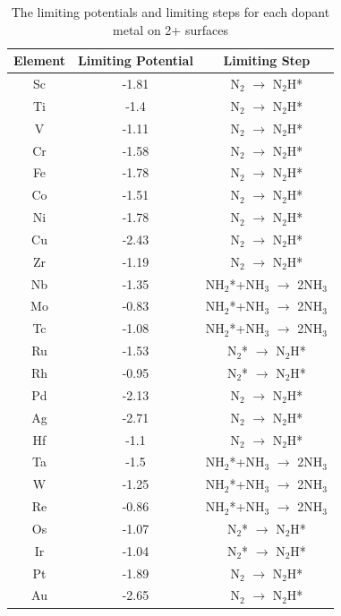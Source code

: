 \documentclass{article}
\begin{document}
\begin{table}
\begin{center}
\begin{tabular}{| c | c |c |}
\hline
Element & Limiting Potential & Limiting Step \\
\hline
Sc & -1.81 & N$_2$ $\rightarrow$ N$_2$H*\\
Ti & -1.4 & N$_2$ $\rightarrow$ N$_2$H*\\
V & -1.11 & N$_2$ $\rightarrow$ N$_2$H*\\
Cr & -1.58 & N$_2$ $\rightarrow$ N$_2$H*\\
Fe & -1.78 & N$_2$ $\rightarrow$ N$_2$H*\\
Co & -1.51 & N$_2$ $\rightarrow$ N$_2$H*\\
Ni & -1.78 & N$_2$ $\rightarrow$ N$_2$H*\\
Cu & -2.43 & N$_2$ $\rightarrow$ N$_2$H*\\
Zr & -1.19 & N$_2$ $\rightarrow$ N$_2$H*\\
Nb & -1.35 & NH$_2$*+NH$_3$ $\rightarrow$ 2NH$_3$\\
Mo & -0.83 & NH$_2$*+NH$_3$ $\rightarrow$ 2NH$_3$\\
Tc & -1.08 & NH$_2$*+NH$_3$ $\rightarrow$ 2NH$_3$\\
Ru & -1.53 & N$_2$* $\rightarrow$ N$_2$H*\\
Rh & -0.95 & N$_2$* $\rightarrow$ N$_2$H*\\
Pd & -2.13 & N$_2$ $\rightarrow$ N$_2$H*\\
Ag & -2.71 & N$_2$ $\rightarrow$ N$_2$H*\\
Hf & -1.1 & N$_2$ $\rightarrow$ N$_2$H*\\
Ta & -1.5 & NH$_2$*+NH$_3$ $\rightarrow$ 2NH$_3$\\
W & -1.25 & NH$_2$*+NH$_3$ $\rightarrow$ 2NH$_3$\\
Re & -0.86 & NH$_2$*+NH$_3$ $\rightarrow$ 2NH$_3$\\
Os & -1.07 & N$_2$* $\rightarrow$ N$_2$H*\\
Ir & -1.04 & N$_2$* $\rightarrow$ N$_2$H*\\
Pt & -1.89 & N$_2$ $\rightarrow$ N$_2$H*\\
Au & -2.65 & N$_2$ $\rightarrow$ N$_2$H*\\
\hline
\end{tabular}
\end{center}
\caption{The limiting potentials and limiting steps for each dopant metal on 2+ surfaces}\label{table:pot_limiting_steps}\end{table}\begin{table}

\end{table}
\end{document}
